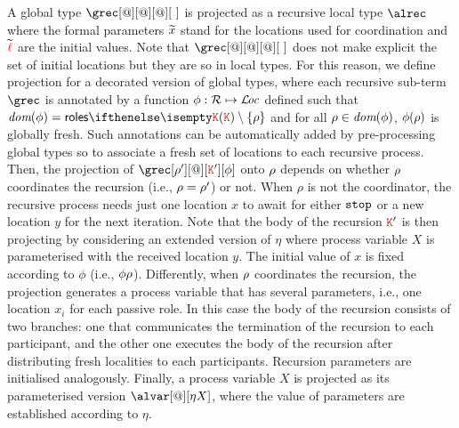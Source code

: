  A global type $\grec[@][@][@][\ ]$ is projected as a recursive 
local type $\alrec$ where the formal parameters $\seq x$ stand 
for the locations used for coordination and 
$\seq \alocvar$ are the initial values. 
%
Note that $\grec[@][@][@][\ ]$ does not make explicit the set of 
initial locations but they are so in local types. 
%
For this reason, we
define projection for a decorated version of global types, where 
each recursive sub-term $\grec$ is annotated by a function
$\aphi:\roleset \mapsto \locset$
defined such that $\dom\aphi = \roles\aK\setminus\{\arole\}$ and 
 for all $\arole\in\dom\aphi$,  $\aphi(\arole)$ is globally fresh.
%
Such annotations can be  automatically added by pre-processing  
global types so to associate a fresh set of locations to each recursive
process. 
%
Then, the projection of 
 $\grec[\arole'][@][\aK'][\aphi]$ onto $\arole$ depends on whether $\arole$
 coordinates the recursion  (i.e., $\arole = \arole'$) or not. 
%
When $\rho$ is not 
 the coordinator, the recursive process needs just one location $x$ to await for 
 either $\asort[stop]$ or a new location $y$ for the next iteration.
%
Note 
 that the body of the recursion $\aK'$ is then projecting by considering an extended 
 version of $\eta$ where process variable $X$ is parameterised with the received 
 location $y$. 
%
The initial value of  $x$ is fixed  according to  
$\phi$  (i.e., $\phi\arole$). 
%
Differently, when $\arole$ coordinates the recursion, the projection generates 
a process variable that has several parameters, i.e., one location $x_i$ for 
each passive role. 
%
In this case the body of the recursion consists of two 
branches: one that communicates the termination of the recursion to 
each participant, and the other one executes the body of the recursion after
distributing fresh localities to each participants. 
%
Recursion parameters are
initialised analogously. 
%
Finally, a process variable $X$ is projected as its parameterised version 
$\alvar [@][\eta X]$, where the value of parameters are established according 
to $\eta$.


